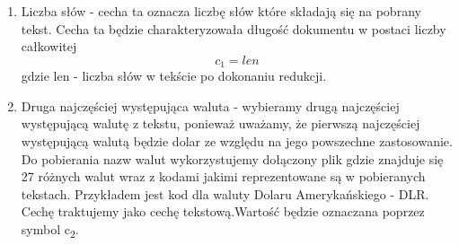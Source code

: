 \documentclass{classrep}
\begin{document}
\begin{enumerate}
  \item Liczba słów - cecha ta oznacza liczbę słów które składają się na pobrany tekst. Cecha ta będzie charakteryzowała długość dokumentu w postaci liczby całkowitej \begin{equation}  c_1 = len \end{equation} gdzie len - liczba słów w tekście po dokonaniu redukcji.\\
  
\item Druga najczęściej występująca waluta - wybieramy drugą najczęściej występującą walutę z tekstu, ponieważ uważamy, że pierwszą najczęściej występującą walutą będzie dolar ze względu na jego powszechne zastosowanie. Do pobierania nazw walut wykorzystujemy dołączony plik gdzie znajduje się 27 różnych walut wraz z kodami jakimi reprezentowane są w pobieranych tekstach. Przykładem jest kod dla waluty Dolaru Amerykańskiego - DLR. Cechę traktujemy jako cechę tekstową.Wartość będzie oznaczana poprzez symbol  c\textsubscript{2}. \\
 

\end{enumerate}
\end{document}
